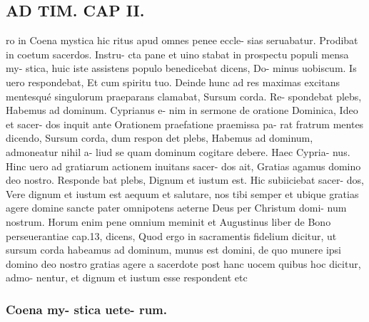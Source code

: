 \documentclass{article}
\begin{document}
\begin{pages}
\section*{AD TIM. CAP II. }
\marginpar{[ p.109 ]}\pstart ro in Coena mystica hic ritus apud omnes penee eccle- sias seruabatur. Prodibat in coetum sacerdos. Instru- cta pane et uino stabat in prospectu populi mensa my- stica, huic iste assistens populo benedicebat dicens, Do- minus uobiscum. Is uero respondebat, Et cum spiritu tuo. Deinde hunc ad res maximas excitans mentesqué singulorum praeparans clamabat, Sursum corda. Re- spondebat plebs, Habemus ad dominum. Cyprianus e- nim in sermone de oratione Dominica, Ideo et sacer- dos inquit ante Orationem praefatione praemissa pa- rat fratrum mentes dicendo, Sursum corda, dum respon det plebs, Habemus ad dominum, admoneatur nihil a- liud se quam dominum cogitare debere. Haec Cypria- nus. Hinc uero ad gratiarum actionem inuitans sacer- dos ait, Gratias agamus domino deo nostro. Responde bat plebs, Dignum et iustum est. Hic subiiciebat sacer- dos, Vere dignum et iustum est aequum et salutare, nos tibi semper et ubique gratias agere domine sancte pater omnipotens aeterne Deus per Christum domi- num nostrum. Horum enim pene omnium meminit et Augustinus liber  de Bono perseuerantiae cap.13, dicens, Quod ergo in sacramentis fidelium dicitur, ut sursum corda habeamus ad dominum, munus est domini, de quo munere ipsi domino deo nostro gratias agere a sacerdote post hanc uocem quibus hoc dicitur, admo- nentur, et dignum et iustum esse respondent etc  \pend
\subsubsection*{Coena my- stica uete- rum. }

\end{pages}
\end{document}
